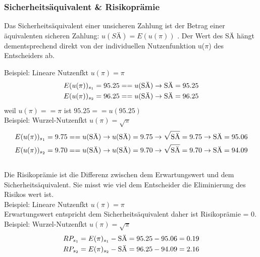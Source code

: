 \documentclass[11pt]{article}
\begin{document}
\subsubsection{Sicherheitsäquivalent \& Risikoprämie}
\label{sec:org14923b7}
Das Sicherheitsäquivalent einer unsicheren Zahlung ist der Betrag einer äquivalenten sicheren Zahlung:
\(u(SÄ) = E(u(\pi))\) . Der Wert des SÄ hängt dementsprechend direkt von der individuellen Nutzenfunktion u(\(\pi\)) des Entscheiders ab.

Beispiel: Lineare Nutzenfkt \(u(\pi)=\pi\) \\
\begin{equation*}
\begin{aligned}
E(u(\pi))_{s_1} = 95.25 == u(\textnormal{SÄ}) \rightarrow \textnormal{SÄ} = 95.25\\
E(u(\pi))_{s_2} = 96.25 == u(\textnormal{SÄ}) \rightarrow \textnormal{SÄ} = 96.25
\end{aligned}
\end{equation*}
weil \(u(\pi) == \pi\) ist \(95.25 == u(95.25)\) \\

Beispiel: Wurzel-Nutzenfkt \(u(\pi)=\sqrt{\pi}\) \\
\begin{equation*}
\begin{aligned}
E(u(\pi))_{s_1} = 9.75 == u(\textnormal{SÄ}) \rightarrow u(\textnormal{SÄ}) = 9.75 \rightarrow \sqrt{\textnormal{SÄ}}=9.75 \rightarrow \textnormal{SÄ}= 95.06\\
E(u(\pi))_{s_2} = 9.70 == u(\textnormal{SÄ}) \rightarrow u(\textnormal{SÄ}) = 9.70 \rightarrow \sqrt{\textnormal{SÄ}}=9.70 \rightarrow \textnormal{SÄ}= 94.09
\end{aligned}
\end{equation*}\\
\newline
Die Risikoprämie ist die Differenz zwischen dem Erwartungswert und dem Sicherheitsäquivalent. Sie misst wie viel dem Entscheider die Eliminierung des Risikos wert ist.\\
Beispiel: Lineare Nutzenfkt $u(\pi)=\pi$ \\
Erwartungswert entspricht dem Sicherheitsäquivalent daher ist Risikoprämie = 0.\\
Beispiel: Wurzel-Nutzenfkt $u(\pi)=\sqrt{\pi}$ \\
\begin{equation*}
\begin{aligned}
RP_{s_1}= E(\pi)_{s_1} - \textnormal{SÄ} = 95.25 - 95.06 = 0.19 \\
RP_{s_2}= E(\pi)_{s_2} - \textnormal{SÄ} = 96.25 - 94.09 = 2.16 \\
\end{aligned}
\end{equation*}
\end{document}
